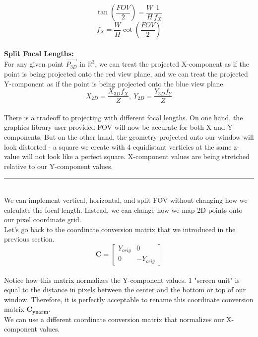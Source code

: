 \documentclass[11.pt]{article}
\begin{document}
$$\tan\left( \frac{FOV}{2} \right) = \frac{W}{H}\frac{1}{f_{X}} $$
$$f_{X} = \frac{W}{H}\cot\left( \frac{FOV}{2} \right)$$\\

\textbf{Split Focal Lengths:}\\

For any given point $\vec{P_{3D}}$ in $\mathbb{R}^3$, we can treat the projected
X-component as if the point is being projected onto the red view plane, and we can treat 
the projected Y-component as if the point is being projected onto the blue view plane.\\

$$ X_{2D} = \frac{X_{3D}f_{X}}{Z}, \: Y_{2D} = \frac{Y_{3D}f_{Y}}{Z}$$\\

There is a tradeoff to projecting with different focal lengths. On one hand, the graphics
library user-provided FOV will now be accurate for both X and Y components. But on the other
hand, the geometry projected onto our window will look distorted - a square we create with
4 equidistant verticies at the same z-value will not look like a perfect square.
X-component values are being stretched relative to our Y-component values.

\rule{12cm}{0.4pt}
\\

We can implement vertical, horizontal, and split FOV without changing how we calculate
the focal length. Instead, we can change how we map 2D points onto our pixel coordinate
grid.\\

Let's go back to the coordinate conversion matrix that we introduced in the previous
section.\\

$$ \mathbf{C} = \begin{bmatrix}  Y_{orig} &      0    \\
                                     0    & -Y_{orig} \end{bmatrix} $$\\

Notice how this matrix normalizes the Y-component values. 1 "screen unit" is equal to
the distance in pixels between the center and the bottom or top of our window. Therefore,
it is perfectly acceptable to rename this coordinate conversion matrix
$\mathbf{C_{ynorm}}$.\\

We can use a different coordinate conversion matrix that normalizes our X-component
values.\\
\end{document}
